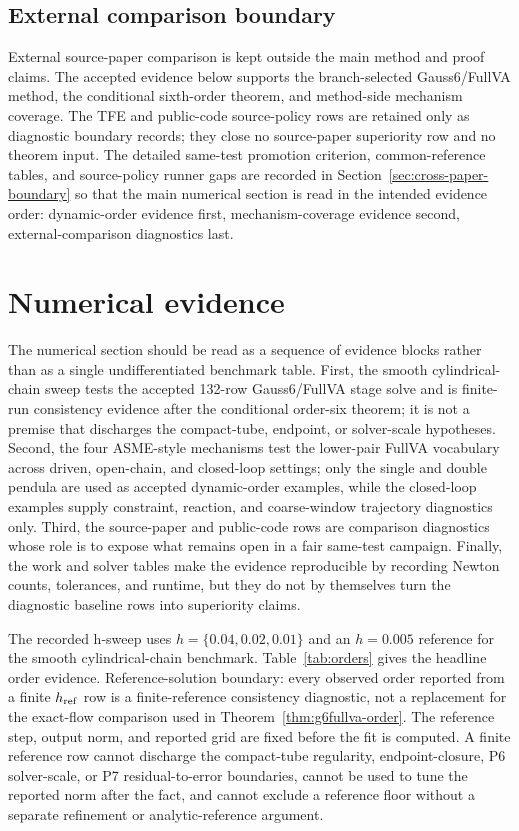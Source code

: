 \documentclass[preprint,12pt]{elsarticle}
\newcommand{\method}{Gauss6\slash FullVA}
\newcommand{\tfe}{TFE}
\begin{document}
\subsection{External comparison boundary}
\label{sec:external-comparison-boundary-pointer}

External source-paper comparison is kept outside the main method and proof
claims.  The accepted evidence below supports the branch-selected
Gauss6/FullVA method, the conditional sixth-order theorem, and method-side
mechanism coverage.  The \tfe{} and public-code source-policy rows are
retained only as diagnostic boundary records; they close no source-paper
superiority row and no theorem input.  The detailed same-test promotion
criterion, common-reference tables, and source-policy runner gaps are recorded
in Section~\ref{sec:cross-paper-boundary} so that the main numerical section
is read in the intended evidence order: dynamic-order evidence first,
mechanism-coverage evidence second, external-comparison diagnostics last.

\section{Numerical evidence}
\label{sec:numerical}

The numerical section should be read as a sequence of evidence blocks rather
than as a single undifferentiated benchmark table. First, the smooth
cylindrical-chain sweep tests the accepted 132-row \method{} stage solve and
is finite-run consistency evidence after the conditional order-six theorem;
it is not a premise that discharges the compact-tube, endpoint, or
solver-scale hypotheses.
Second, the four ASME-style mechanisms test the lower-pair FullVA vocabulary
across driven, open-chain, and closed-loop settings; only the single and
double pendula are used as accepted dynamic-order examples, while the
closed-loop examples supply constraint, reaction, and coarse-window trajectory
diagnostics only. Third, the source-paper and public-code rows are comparison
diagnostics whose role is to expose what remains open in a fair same-test
campaign. Finally, the work and solver tables make the evidence reproducible
by recording Newton counts, tolerances, and runtime, but they do not by
themselves turn the diagnostic baseline rows into superiority claims.

The recorded h-sweep uses $h=\{0.04,0.02,0.01\}$ and an $h=0.005$ reference
for the smooth cylindrical-chain benchmark. Table~\ref{tab:orders} gives the
headline order evidence.
Reference-solution boundary: every observed order reported from a finite
\(h_{\rm ref}\) row is a finite-reference consistency diagnostic, not a
replacement for the exact-flow comparison used in
Theorem~\ref{thm:g6fullva-order}.  The reference step, output norm, and
reported grid are fixed before the fit is computed.  A finite reference row
cannot discharge the compact-tube regularity, endpoint-closure, P6
solver-scale, or P7 residual-to-error boundaries, cannot be used to tune the
reported norm after the fact, and cannot exclude a reference floor without a
separate refinement or analytic-reference argument.
\end{document}
